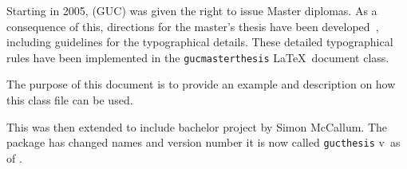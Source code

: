 Starting in 2005, \GUC (GUC) was given the
right to issue Master diplomas. As a consequence of this, directions
for the master's thesis have been developed~\cite{GUCMaster},
including guidelines for the typographical details. These detailed
typographical rules have been implemented in the
\texttt{gucmasterthesis} \LaTeX\ document class.


The purpose of this document is to provide an example and description
on how this class file can be used.


This was then extended to include bachelor project by Simon McCallum.
The package has changed names and version number it is now called
\texttt{gucthesis}
v\gucthesisversion\ as of \gucthesisdate.
